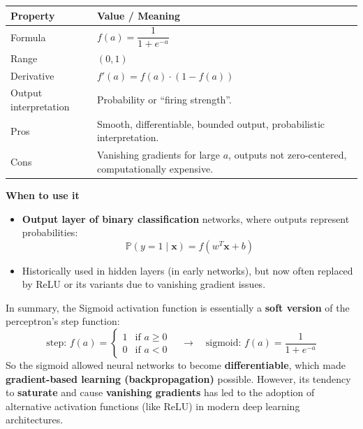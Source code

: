 \begin{table}[!htp]
    \centering
    \begin{tabular}{@{} l p{20em} @{}}
        \toprule
        \textbf{Property} & \textbf{Value / Meaning} \\
        \midrule
        Formula & $f(a) = \dfrac{1}{1 + e^{-a}}$ \\[1em]
        Range & $(0, 1)$ \\[.5em]
        Derivative & $f'(a) = f(a) \cdot (1 - f(a))$ \\[.5em]
        Output interpretation & Probability or ``firing strength''. \\[.5em]
        Pros & Smooth, differentiable, bounded output, probabilistic interpretation. \\[.5em]
        Cons & Vanishing gradients for large $a$, outputs not zero-centered, computationally expensive. \\
        \bottomrule
    \end{tabular}
\end{table}

\begin{flushleft}
    \textcolor{Green3}{ \textbf{When to use it}}
\end{flushleft}
\begin{itemize}
    \item \textbf{Output layer of binary classification} networks, where outputs represent probabilities:
    \begin{equation*}
        \mathbb{P}\left( y = 1 \mid \mathbf{x} \right) = f(w^{T} \mathbf{x} + b)
    \end{equation*}
    \item Historically used in hidden layers (in early networks), but now often replaced by ReLU or its variants due to vanishing gradient issues.
\end{itemize}

\highspace
In summary, the Sigmoid activation function is essentially a \textbf{soft version} of the perceptron's step function:
\begin{equation*}
    \text{step: } f(a) = \begin{cases}
        1 & \text{if } a \geq 0 \\
        0 & \text{if } a < 0
    \end{cases}
    \quad \longrightarrow \quad
    \text{sigmoid: } f(a) = \dfrac{1}{1 + e^{-a}}
\end{equation*}
So the sigmoid allowed neural networks to become \textbf{differentiable}, which made \textbf{gradient-based learning (backpropagation)} possible. However, its tendency to \textbf{saturate} and cause \textbf{vanishing gradients} has led to the adoption of alternative activation functions (like ReLU) in modern deep learning architectures.
